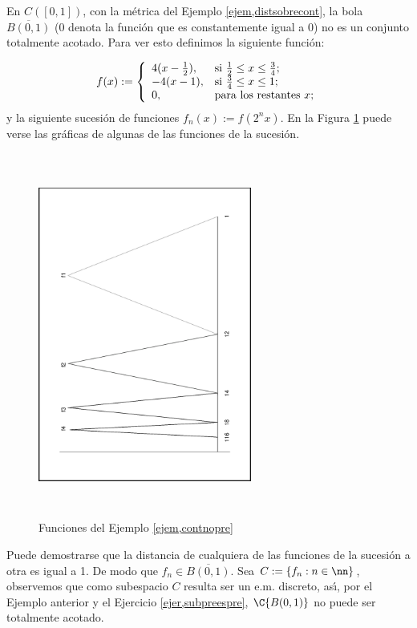\begin{ejemplo}\label{ejem,contnopre} En $C([0,1])$, con la m\'etrica del Ejemplo
\vref{ejem,distsobrecont}, la bola $\overline{B(0,1)}$ (0 denota
la funci\'on que es constantemente igual a 0) no es un conjunto
totalmente acotado. Para ver esto definimos la siguiente
funci\'on:

\[
    f(x):=\left\{%
\begin{array}{ll}
    4(x-\frac12), & \hbox{si $\frac12\leq x\leq \frac34$;} \\
    -4(x-1), & \hbox{si $\frac34\leq x\leq 1$;} \\
    0, & \hbox{para los restantes $x$;} \\
\end{array}
\right.
\]
y la siguiente sucesi\'on de funciones $f_n(x):=f(2^nx)$. En la
Figura \ref{fig,contnopre} puede verse las gr\'aficas de algunas
de las funciones de la sucesi\'on.

\begin{figure}[h]
\begin{center}
    \includegraphics[height=12cm,
    width=7cm,angle=-90]{noprecom.eps}
    \caption{Funciones del Ejemplo
    \ref{ejem,contnopre}}\label{fig,contnopre}
\end{center}
\end{figure}

Puede demostrarse que la distancia de cualquiera de las funciones
de la sucesi\'on a otra es igual a 1. De modo que $f_n\in
\overline{B(0,1)}$. Sea $C:=\{f_n:n\in\nn\}$, observemos que como
subespacio $C$ resulta ser un e.m. discreto, as\'{\i}, por el
Ejemplo anterior y el Ejercicio \vref{ejer,subpreespre},
$\C{B(0,1)}$ no puede ser totalmente acotado.
\end{ejemplo}

